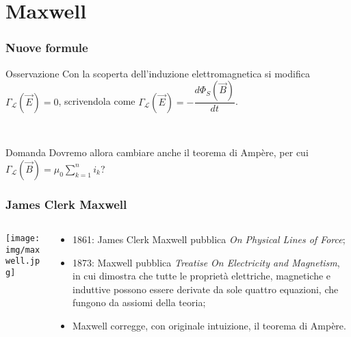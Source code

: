 \documentclass[]{beamer}
\theoremstyle{plain}
\begin{document}
\section{Maxwell}


\begin{frame}
  \frametitle{Nuove formule}
  \begin{block}{Osservazione}
 Con la scoperta dell'induzione elettromagnetica si modifica $ \Gamma_\mathscr{L} (\vec{E}) = 0 $, scrivendola come $ \Gamma_\mathscr{L} (\vec{E}) = - \dfrac{d\Phi_S(\vec{B})}{dt} $. 
\end{block}\pause

~

\begin{alertblock}{Domanda}
Dovremo allora cambiare anche il teorema di Ampère, per cui $ \Gamma_\mathscr{L} (\vec{B}) = \mu_0 \sum\limits_{k=1}^n i_k $?  
\end{alertblock}
\end{frame}

\begin{frame}
\frametitle{James Clerk Maxwell}
\begin{columns}
\begin{column}{0.2\textwidth}
\texttt{[image: img/maxwell.jpg]}
\end{column}
\begin{column}{0.7\textwidth}
\begin{itemize}
\item<1-> 1861: James Clerk Maxwell pubblica \emph{On Physical Lines of Force};
\item<2-> 1873: Maxwell pubblica \emph{Treatise On Electricity and Magnetism}, in cui dimostra che \alert<2>{tutte le proprietà elettriche, magnetiche e induttive possono essere derivate da sole quattro equazioni}, che fungono da \alert<2>{assiomi} della teoria;
\item<3-> Maxwell corregge, con originale intuizione, il teorema di Ampère.
\end{itemize}
\end{column}
\end{columns}
\end{frame}
\end{document}
